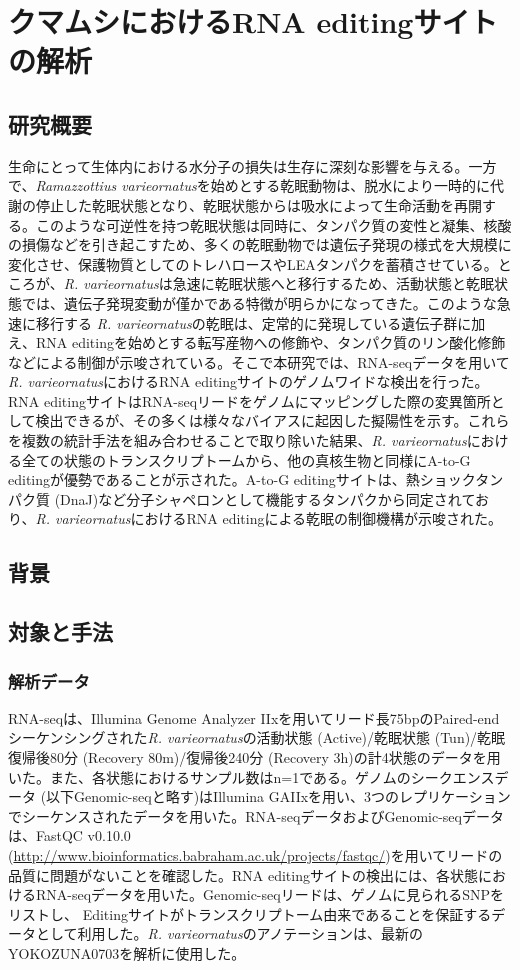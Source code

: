 \chapter{クマムシにおけるRNA editingサイトの解析}

\section{研究概要}
生命にとって生体内における水分子の損失は生存に深刻な影響を与える。一方で、{\it Ramazzottius varieornatus}を始めとする乾眠動物は、脱水により一時的に代謝の停止した乾眠状態となり、乾眠状態からは吸水によって生命活動を再開する。このような可逆性を持つ乾眠状態は同時に、タンパク質の変性と凝集、核酸の損傷などを引き起こすため、多くの乾眠動物では遺伝子発現の様式を大規模に変化させ、保護物質としてのトレハロースやLEAタンパクを蓄積させている。ところが、{\it R. varieornatus}は急速に乾眠状態へと移行するため、活動状態と乾眠状態では、遺伝子発現変動が僅かである特徴が明らかになってきた。このような急速に移行する {\it R. varieornatus}の乾眠は、定常的に発現している遺伝子群に加え、RNA editingを始めとする転写産物への修飾や、タンパク質のリン酸化修飾などによる制御が示唆されている。そこで本研究では、RNA-seqデータを用いて{\it R. varieornatus}におけるRNA editingサイトのゲノムワイドな検出を行った。RNA editingサイトはRNA-seqリードをゲノムにマッピングした際の変異箇所として検出できるが、その多くは様々なバイアスに起因した擬陽性を示す。これらを複数の統計手法を組み合わせることで取り除いた結果、{\it R. varieornatus}における全ての状態のトランスクリプトームから、他の真核生物と同様にA-to-G editingが優勢であることが示された。A-to-G editingサイトは、熱ショックタンパク質 (DnaJ)など分子シャペロンとして機能するタンパクから同定されており、{\it R. varieornatus}におけるRNA editingによる乾眠の制御機構が示唆された。

\section{背景}

\section{対象と手法}
\subsection{解析データ}
RNA-seqは、Illumina Genome Analyzer IIxを用いてリード長75bpのPaired-endシーケンシングされた{\it R. varieornatus}の活動状態 (Active)/乾眠状態 (Tun)/乾眠復帰後80分 (Recovery 80m)/復帰後240分 (Recovery 3h)の計4状態のデータを用いた。また、各状態におけるサンプル数はn=1である。ゲノムのシークエンスデータ (以下Genomic-seqと略す)はIllumina GAIIxを用い、3つのレプリケーションでシーケンスされたデータを用いた。RNA-seqデータおよびGenomic-seqデータは、FastQC v0.10.0 (\url{http://www.bioinformatics.babraham.ac.uk/projects/fastqc/})を用いてリードの品質に問題がないことを確認した。RNA editingサイトの検出には、各状態におけるRNA-seqデータを用いた。Genomic-seqリードは、ゲノムに見られるSNPをリストし、 Editingサイトがトランスクリプトーム由来であることを保証するデータとして利用した。{\it R. varieornatus}のアノテーションは、最新のYOKOZUNA0703を解析に使用した。

